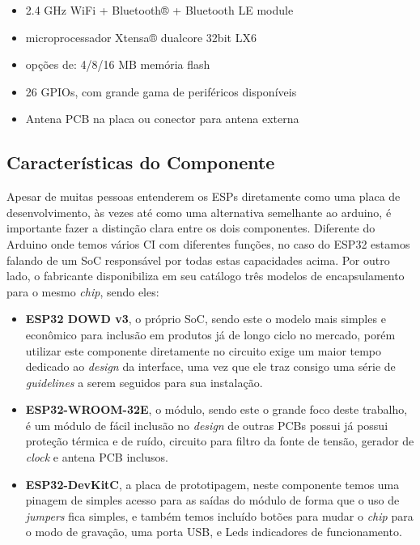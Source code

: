 \begin{itemize}
\item 2.4 GHz Wi­Fi + Bluetooth® + Bluetooth LE module
\item microprocessador Xtensa® dual­core 32­bit LX6
\item opções de: 4/8/16 MB memória flash
\item 26 GPIOs, com grande gama de periféricos disponíveis
\item Antena PCB na placa ou conector para antena externa
\end{itemize}

\subsection{Características do Componente}

Apesar de muitas pessoas entenderem os ESPs diretamente como uma placa de desenvolvimento, às vezes até como uma 
alternativa semelhante ao arduino, é importante fazer a distinção clara entre os dois componentes. Diferente 
do Arduino onde temos vários \ac{CI} com diferentes funções, no caso do ESP32 estamos falando de um \ac{SoC} responsável
por todas estas capacidades acima. Por outro lado, o fabricante disponibiliza em seu catálogo três modelos de encapsulamento
para o mesmo \textit{chip}, sendo eles: 

\begin{itemize}
    \item \textbf{ESP32 DOWD v3}, o próprio \ac{SoC}, sendo este o modelo mais simples e econômico para inclusão em produtos já de longo ciclo no 
    mercado, porém utilizar este componente diretamente no circuito exige um maior tempo dedicado ao \textit{design} da interface, uma 
    vez que ele traz consigo uma série de \textit{guidelines} a serem seguidos para sua instalação. \cite{datasheet-soc}
    \item \textbf{ESP32-WROOM-32E}, o módulo, sendo este o grande foco deste trabalho, é um módulo de fácil inclusão no \textit{design} de outras PCBs   
    possui já possui proteção térmica e de ruído, circuito para filtro da fonte de tensão, gerador de \textit{clock} e antena PCB inclusos. \cite{datasheet-modulo}
    \item \textbf{ESP32-DevKitC}, a placa de prototipagem, neste componente temos uma pinagem de simples acesso para as saídas do módulo de forma 
    que o uso de \textit{jumpers} fica simples, e também temos incluído botões para mudar o \textit{chip} para o modo de gravação, uma porta USB, e
    Leds indicadores de funcionamento.
\end{itemize}

